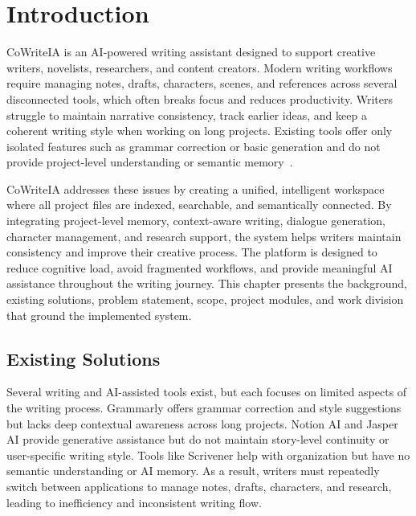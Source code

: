 \chapter{Introduction}
\label{sec:introduction}

CoWriteIA is an AI-powered writing assistant designed to support creative writers, novelists, researchers, and content creators. Modern writing workflows require managing notes, drafts, characters, scenes, and references across several disconnected tools, which often breaks focus and reduces productivity. Writers struggle to maintain narrative consistency, track earlier ideas, and keep a coherent writing style when working on long projects. Existing tools offer only isolated features such as grammar correction or basic generation and do not provide project-level understanding or semantic memory~\cite{lewis2020rag,reimers2019sentencebert}. 

CoWriteIA addresses these issues by creating a unified, intelligent workspace where all project files are indexed, searchable, and semantically connected. By integrating project-level memory, context-aware writing, dialogue generation, character management, and research support, the system helps writers maintain consistency and improve their creative process. The platform is designed to reduce cognitive load, avoid fragmented workflows, and provide meaningful AI assistance throughout the writing journey. 
This chapter presents the background, existing solutions, problem statement, scope, project modules, and work division that ground the implemented system.
 
\section{Existing Solutions}

Several writing and AI-assisted tools exist, but each focuses on limited aspects of the writing process. Grammarly offers grammar correction and style suggestions but lacks deep contextual awareness across long projects. Notion AI and Jasper AI provide generative assistance but do not maintain story-level continuity or user-specific writing style. Tools like Scrivener help with organization but have no semantic understanding or AI memory. As a result, writers must repeatedly switch between applications to manage notes, drafts, characters, and research, leading to inefficiency and inconsistent writing flow.

